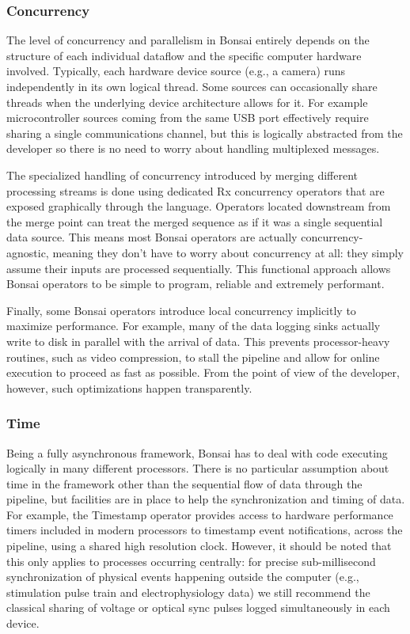 \subsubsection{Concurrency}

The level of concurrency and parallelism in Bonsai entirely depends on the structure of each individual dataflow and the specific computer hardware involved. Typically, each hardware device source (e.g., a camera) runs independently in its own logical thread. Some sources can occasionally share threads when the underlying device architecture allows for it. For example microcontroller sources coming from the same USB port effectively require sharing a single communications channel, but this is logically abstracted from the developer so there is no need to worry about handling multiplexed messages.

The specialized handling of concurrency introduced by merging different processing streams is done using dedicated Rx concurrency operators that are exposed graphically through the language. Operators located downstream from the merge point can treat the merged sequence as if it was a single sequential data source. This means most Bonsai operators are actually concurrency-agnostic, meaning they don't have to worry about concurrency at all: they simply assume their inputs are processed sequentially. This functional approach allows Bonsai operators to be simple to program, reliable and extremely performant.

Finally, some Bonsai operators introduce local concurrency implicitly to maximize performance. For example, many of the data logging sinks actually write to disk in parallel with the arrival of data. This prevents processor-heavy routines, such as video compression, to stall the pipeline and allow for online execution to proceed as fast as possible. From the point of view of the developer, however, such optimizations happen transparently.

\subsubsection{Time}

Being a fully asynchronous framework, Bonsai has to deal with code executing logically in many different processors. There is no particular assumption about time in the framework other than the sequential flow of data through the pipeline, but facilities are in place to help the synchronization and timing of data. For example, the Timestamp operator provides access to hardware performance timers included in modern processors to timestamp event notifications, across the pipeline, using a shared high resolution clock. However, it should be noted that this only applies to processes occurring centrally: for precise sub-millisecond synchronization of physical events happening outside the computer (e.g., stimulation pulse train and electrophysiology data) we still recommend the classical sharing of voltage or optical sync pulses logged simultaneously in each device.


